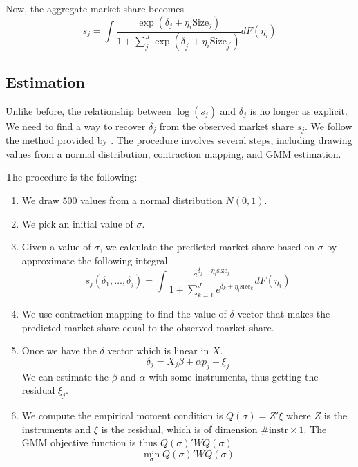 \documentclass[12pt]{article}[margin=1in]
\begin{document}
Now, the aggregate market share becomes
\[
    s_j = \int \frac{\exp{(\delta_j + \eta_i \text{Size}_j)}}{1 + \sum_{j^{\prime}}^{J} \exp{(\delta_{j^{\prime}} + \eta_i \text{Size}_{j^{\prime}})}} dF(\eta_i)
\]

\subsection{Estimation}
Unlike before, the relationship between $\log(s_j)$ and $\delta_j$ is no longer
as explicit. We need to find a way to recover $\delta_j$ from the observed
market share $s_j$. We follow the method provided by
\citet{berrylevinsohnpakes1995}. The procedure involves several steps,
including drawing values from a normal distribution, contraction mapping, and
GMM estimation.

The procedure is the following:
\begin{enumerate}
    \item We draw 500 values from a normal distribution $N(0,1)$.
    \item We pick an initial value of $\sigma$.
    \item Given a value of $\sigma$, we calculate the predicted market share based on
          $\sigma$ by approximate the following integral
          \begin{equation*}
              s_j(\delta_1,\ldots,\delta_j)=\int \frac{e^{\delta_j+\eta_i\text{size}_j}}{1+\sum_{k=1}^{J}e^{\delta_k+\eta_i\text{size}_k}}dF(\eta_i)
          \end{equation*}
    \item We use contraction mapping to find the value of $\delta$ vector that makes the
          predicted market share equal to the observed market share.
    \item Once we have the $\delta$ vector which is linear in $X$.
          \begin{equation*}
              \delta_j=X_j\beta+\alpha p_j+\xi_j
          \end{equation*}
          We can estimate the $\beta$ and $\alpha$ with some instruments, thus getting the residual $\xi_j$.
    \item We compute the empirical moment condition is $Q(\sigma)=Z'\xi$ where $Z$ is the
          instruments and $\xi$ is the residual, which is of dimension $ \# \text{instr}
              \times 1$. The GMM objective function is thus $Q(\sigma)'WQ(\sigma)$.
          \begin{equation*}
              \min_{\sigma} Q(\sigma)'WQ(\sigma)
          \end{equation*}
\end{enumerate}
\end{document}
